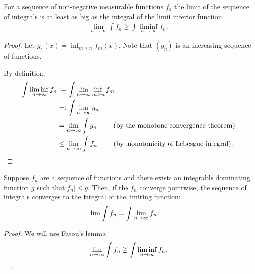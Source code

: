\begin{theorem}
  For a sequence of non-negative measurable functions $f_n$ the limit of the sequence of integrals is at least
  as big as the integral of the limit inferior function.
  \begin{align*}
    \lim_{n\to\infty} \int f_n \geq \int \liminf_{n\to\infty} f_n.
  \end{align*}
\end{theorem}

\begin{proof}
  Let $g_n(x) = \inf_{m\geq n}f_m(x)$. Note that $(g_n)$ is an increasing sequence of functions.

  By definition,
  \begin{align*}
    \int \liminf_{n\to\infty} f_n
    &:= \int \limn \inf_{m\geq n}f_m \\
    &=: \int \limn g_n \\
    &= \limn \int g_n ~~~~~~~\text{(by the monotone convergence theorem)}\\
    &\leq \limn \int f_n ~~~~~~~\text{(by monotonicity of Lebesgue integral)}.
  \end{align*}
\end{proof}


\begin{theorem*}
  Suppose $f_n$ are a sequence of functions and there exists an integrable dominating function $g$ such
  that$|f_n| \leq g$. Then, if the $f_n$ converge pointwise, the sequence of integrals converges to the
  integral of the limiting function:
  \begin{align*}
    \lim \int f_n &= \int \limn f_n.
  \end{align*}
\end{theorem*}

\begin{proof}
  We will use Fatou's lemma
  \begin{align*}
    \limn \int f_n \geq \int \liminf_{n\to\infty} f_n.
  \end{align*}

\end{proof}


